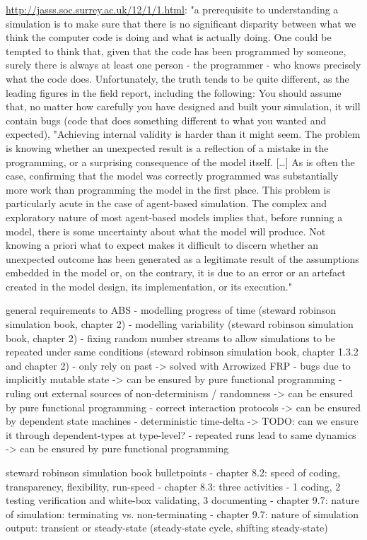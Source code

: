 \url{http://jasss.soc.surrey.ac.uk/12/1/1.html}: "a prerequisite to understanding a simulation is to make sure that there is no significant disparity between what we think the computer code is doing and what is actually doing. One could be tempted to think that, given that the code has been programmed by someone, surely there is always at least one person - the programmer - who knows precisely what the code does. Unfortunately, the truth tends to be quite different, as the leading figures in the field report, including the following: You should assume that, no matter how carefully you have designed and built your simulation, it will contain bugs (code that does something different to what you wanted and expected), "Achieving internal validity is harder than it might seem. The problem is knowing whether an unexpected result is a reflection of a mistake in the programming, or a surprising consequence of the model itself. […] As is often the case, confirming that the model was correctly programmed was substantially more work than programming the model in the first place. This problem is particularly acute in the case of agent-based simulation. The complex and exploratory nature of most agent-based models implies that, before running a model, there is some uncertainty about what the model will produce. Not knowing a priori what to expect makes it difficult to discern whether an unexpected outcome has been generated as a legitimate result of the assumptions embedded in the model or, on the contrary, it is due to an error or an artefact created in the model design, its implementation, or its execution."


general requirements to ABS
- modelling progress of time (steward robinson simulation book, chapter 2)
- modelling variability (steward robinson simulation book, chapter 2)
- fixing random number streams to allow simulations to be repeated under same conditions (steward robinson simulation book, chapter 1.3.2 and chapter 2)
- only rely on past
	-> solved with Arrowized FRP
- bugs due to implicitly mutable state
	-> can be ensured by pure functional programming
- ruling out external sources of non-determinism / randomness
	-> can be ensured by pure functional programming
- correct interaction protocols
	-> can be ensured by dependent state machines
- deterministic time-delta
	-> TODO: can we ensure it through dependent-types at type-level?
- repeated runs lead to same dynamics
	-> can be ensured by pure functional programming

steward robinson simulation book bulletpoints
- chapter 8.2: speed of coding, transparency, flexibility, run-speed
- chapter 8.3: three activities - 1 coding, 2 testing verification and white-box validating, 3 documenting
- chapter 9.7: nature of simulation: terminating vs. non-terminating
- chapter 9.7: nature of simulation output: transient or steady-state (steady-state cycle, shifting steady-state)

